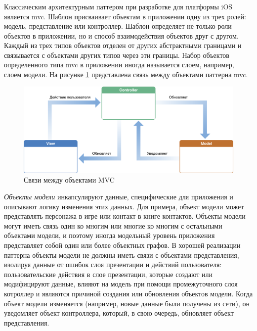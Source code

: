 \subsubsection {}
\label{sec:analysis:research:mobArch:mvc}

Классическим архитектурным паттером при разработке для платформы iOS является \gls{mvc}. Шаблон присваивает объектам в приложении одну из трех ролей: модель, представление или контроллер. Шаблон определяет не только роли объектов в приложении, но и способ взаимодействия объектов друг с другом. Каждый из трех типов объектов отделен от других абстрактными границами и связывается с объектами других типов через эти границы. Набор объектов определенного типа \gls{mvc} в приложении иногда называется слоем, например, слоем модели\cite{apple:mvc}. На рисунке \ref{sec:analysis:research:mobArch:apple-mvc:image:mvc} представлена связь между объектами паттерна \gls{mvc}.

\begin{figure}[h]
  \centering
    \includegraphics[width=1\textwidth]{inc/img/mvc.png}
  \caption{Связи между объектами MVC}
  \label{sec:analysis:research:mobArch:apple-mvc:image:mvc}
\end{figure}

\emph{Объекты модели} инкапсулируют данные, специфические для приложения и описывают логику изменения этих данных. Для примера, объект модели может представлять персонажа в игре или контакт в книге контактов. Объекты модели могут иметь связь один ко многим или многие ко многим с остальными объектами модели, и поэтому иногда модельный уровень приложения представляет собой один или более объектных графов. В хорошей реализации паттерна объекты модели не должны иметь связи с объектами представления, изолируя данные от ошибок слоя презентации и действий пользователя: пользовательские действия в слое презентации, которые создают или модифицируют данные, влияют на модель при помощи промежуточного слоя котроллер и являются причиной создания или обновления объектов модели. Когда объект модели изменяется (например, новые данные были получены из сети), он уведомляет объект контроллера, который, в свою очередь, обновляет объект представления.

